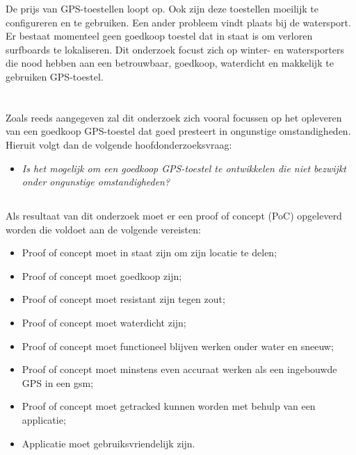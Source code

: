 De prijs van GPS-toestellen loopt op. Ook zijn deze toestellen moeilijk te configureren en te gebruiken. Een ander probleem vindt plaats bij de watersport. Er bestaat momenteel geen goedkoop toestel dat in staat is om verloren surfboards te lokaliseren. Dit onderzoek focust zich op winter- en watersporters die nood hebben aan een betrouwbaar, goedkoop, waterdicht en makkelijk te gebruiken GPS-toestel.

\section{}
\subsection{}
\label{sec:onderzoeksvraag}

Zoals reeds aangegeven zal dit onderzoek zich vooral focussen op het opleveren van een goedkoop GPS-toestel dat goed presteert in ongunstige omstandigheden. Hieruit volgt dan de volgende hoofdonderzoeksvraag:
\newline
\begin{itemize}
	\item[] \textit{Is het mogelijk om een goedkoop GPS-toestel te ontwikkelen die niet bezwijkt onder ongunstige omstandigheden?}
\end{itemize}

\subsection{}
Als resultaat van dit onderzoek moet er een proof of concept (PoC) opgeleverd worden die voldoet aan de volgende vereisten:
\begin{itemize}
	\item Proof of concept moet in staat zijn om zijn locatie te delen;
	\item Proof of concept moet goedkoop zijn;
	\item Proof of concept moet resistant zijn tegen zout;
	\item Proof of concept moet waterdicht zijn;
    \item Proof of concept moet functioneel blijven werken  onder water en sneeuw;
	\item Proof of concept moet minstens even accuraat werken als een ingebouwde GPS in een gsm;
	\item Proof of concept moet getracked kunnen worden met behulp van een applicatie;
	\item Applicatie moet gebruiksvriendelijk zijn.
\end{itemize}

